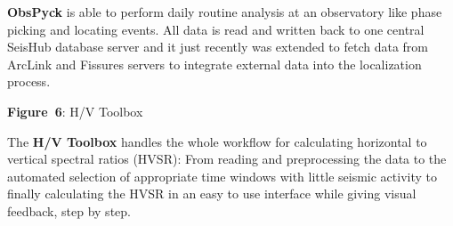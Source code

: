 \documentclass[final]{lmuposter}
\begin{document}
{\begin{multicols}{3}
\textbf{ObsPyck} is able to perform daily routine analysis at an observatory like phase picking and locating events. All data is read and written back to one central SeisHub database server and it just recently was extended to fetch data from ArcLink and Fissures servers to integrate external data into the localization process.
\columnbreak
\begin{center}
{\newline \small \textbf{Figure~6}: H/V Toolbox
} \\[.5\MyBoxVSep]
\end{center}
The \textbf{H/V Toolbox} handles the whole workflow for calculating horizontal to vertical spectral ratios (HVSR): From reading and preprocessing the data to the automated selection of appropriate time windows with little seismic activity to finally calculating the HVSR in an easy to use interface while giving visual feedback, step by step.




\end{multicols}
}
\end{document}
